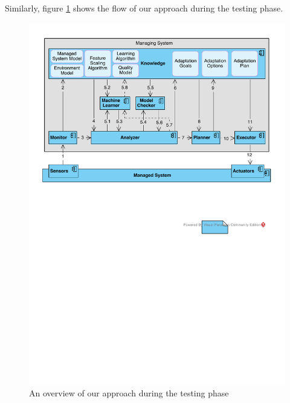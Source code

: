 \documentclass[a4paper,12pt]{article}
\begin{document}
Similarly, figure \ref{TestingView} shows the flow of our approach during the testing phase. 
\begin{figure}[H]
	\centering
	\includegraphics[keepaspectratio, width=\linewidth]{figures/TestingView.pdf}
	\caption{An overview of our approach during the testing phase}
	\label{TestingView}
\end{figure}
\end{document}
